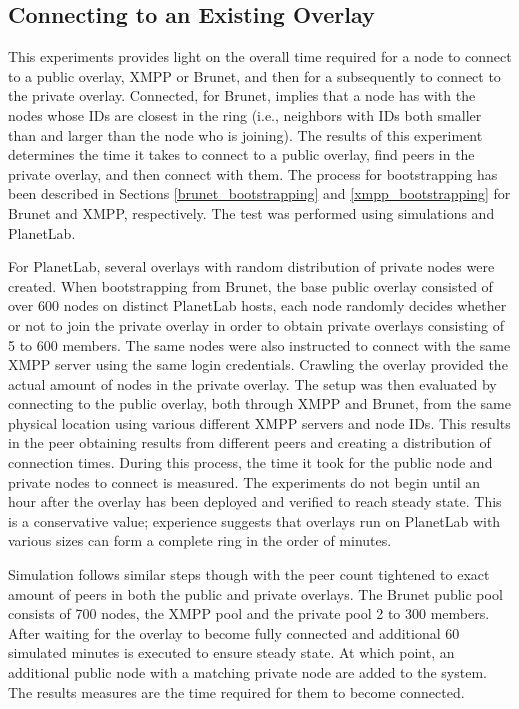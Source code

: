 \documentclass[conference]{IEEEtran}
\begin{document}
\subsection{Connecting to an Existing Overlay}

This experiments provides light on the overall time required for a node to
connect to a public overlay, XMPP or Brunet, and then for a subsequently to
connect to the private overlay.  Connected, for Brunet, implies that a node has
with the nodes whose IDs are closest in the ring (i.e., neighbors with IDs both
smaller than and larger than the node who is joining).  The results of this
experiment determines the time it takes to connect to a public overlay, find
peers in the private overlay, and then connect with them.  The process for
bootstrapping has been described in Sections \ref{brunet_bootstrapping} and
\ref{xmpp_bootstrapping} for Brunet and XMPP, respectively.  The test was
performed using simulations and PlanetLab.

For PlanetLab, several overlays with random distribution of private nodes were
created.  When bootstrapping from Brunet, the base public overlay consisted of
over 600 nodes on distinct PlanetLab hosts, each node randomly decides whether
or not to join the private overlay in order to obtain private overlays
consisting of 5 to 600 members.  The same nodes were also instructed to connect
with the same XMPP server using the same login credentials.  Crawling the
overlay provided the actual amount of nodes in the private overlay.  The setup
was then evaluated by connecting to the public overlay, both through XMPP and
Brunet, from the same physical location using various different XMPP servers
and node IDs.  This results in the peer obtaining results from different peers
and creating a distribution of connection times.  During this process, the time
it took for the public node and private nodes to connect is measured.  The
experiments do not begin until an hour after the overlay has been deployed and
verified to reach steady state.  This is a conservative value; experience
suggests that overlays run on PlanetLab with various sizes can form a complete
ring in the order of minutes.

Simulation follows similar steps though with the peer count tightened to exact
amount of peers in both the public and private overlays.  The Brunet public
pool consists of 700 nodes, the XMPP pool and the private pool 2 to 300
members.  After waiting for the overlay to become fully connected and
additional 60 simulated minutes is executed to ensure steady state.  At which
point, an additional public node with a matching private node are added to the
system.  The results measures are the time required for them to become
connected.
\end{document}
